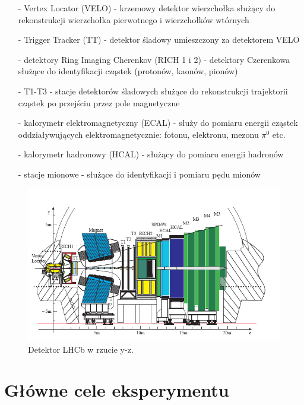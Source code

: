\documentclass{pracamgr}
\begin{document}
\begin{itemize}
 \item[-] Vertex Locator (VELO) - krzemowy detektor wierzchołka służący do rekonstrukcji wierzchołka pierwotnego i wierzchołków wtórnych
 \item[-] Trigger Tracker (TT) - detektor śladowy umieszczony za detektorem VELO
 \item[-] detektory Ring Imaging Cherenkov (RICH 1 i 2) - detektory Czerenkowa służące do identyfikacji cząstek (protonów, kaonów, pionów)
 \item[-] T1-T3 - stacje detektorów śladowych służące do rekonstrukcji trajektorii cząstek po przejściu przez pole magnetyczne 
 \item[-] kalorymetr elektromagnetyczny (ECAL) - służy do pomiaru energii cząstek oddziaływujących elektromagnetycznie: fotonu, elektronu, mezonu $\pi^0$ etc.
 \item[-] kalorymetr hadronowy (HCAL) - służący do pomiaru energii hadronów
 \item[-] stacje mionowe - służące do identyfikacji i pomiaru pędu mionów
\end{itemize}

\begin{figure}[h!]
 \centering
 \includegraphics[width=1.0\textwidth]{rysunki/introduction/det1.png}
 \caption{Detektor LHCb w rzucie y-z.}
\end{figure}

\section{Główne cele eksperymentu}
\end{document}
